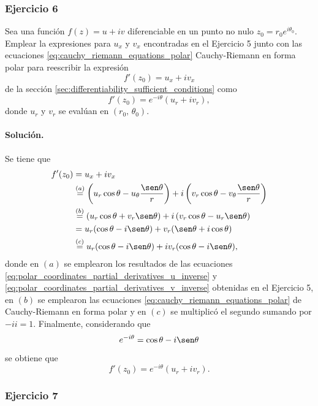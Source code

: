 \documentclass[a4paper]{report}
\begin{document}
\subsubsection{Ejercicio 6}

Sea una función \(f(z)=u+iv\) diferenciable en un punto no nulo \(z_0=r_0e^{i\theta_0}\). Emplear la expresiones para \(u_x\) y \(v_x\) encontradas en el Ejercicio 5 junto con las ecuaciones \ref{eq:cauchy_riemann_equations_polar} Cauchy-Riemann en forma polar para reescribir la expresión 
\[
 f'(z_0)=u_x+iv_x
\]
de la sección \ref{sec:differentiability_sufficient_conditions} como
\begin{equation}\label{eq:cauchy_riemann_f_derivative_polar}
 f'(z_0)=e^{-i\theta}(u_r+iv_r),
\end{equation}
donde \(u_r\) y \(v_r\) se evalúan en \((r_0,\,\theta_0)\).

\paragraph{Solución.} Se tiene que 
\begin{align}
 f'(z_0)&=u_x+iv_x\nonumber\\
  &\overset{(a)}{=}\left(u_r\cos\theta-u_\theta\frac{\sen\theta}{r}\right)+i\left(v_r\cos\theta-v_\theta\frac{\sen\theta}{r}\right)\label{eq:exercise_24_06_f_derivative}\\
  &\overset{(b)}{=}\left(u_r\cos\theta+v_r\sen\theta\right)+i\left(v_r\cos\theta-u_r\sen\theta\right)\nonumber\\
  &=u_r(\cos\theta-i\sen\theta)+v_r(\sen\theta+i\cos\theta)\nonumber\\
  &\overset{(c)}{=}u_r(\cos\theta-i\sen\theta)+iv_r(\cos\theta-i\sen\theta),\nonumber
\end{align}
donde en \((a)\) se emplearon los resultados de las ecuaciones \ref{eq:polar_coordinates_partial_derivatives_u_inverse} y \ref{eq:polar_coordinates_partial_derivatives_v_inverse} obtenidas en el Ejercicio 5, en \((b)\) se emplearon las ecuaciones \ref{eq:cauchy_riemann_equations_polar} de Cauchy-Riemann en forma polar y en \((c)\) se multiplicó el segundo sumando por \(-ii=1\). Finalmente, considerando que 
\[
 e^{-i\theta}=\cos\theta-i\sen\theta
\]
se obtiene que 
\[
 f'(z_0)=e^{-i\theta}(u_r+iv_r).
\]

\subsubsection{Ejercicio 7}
\end{document}
